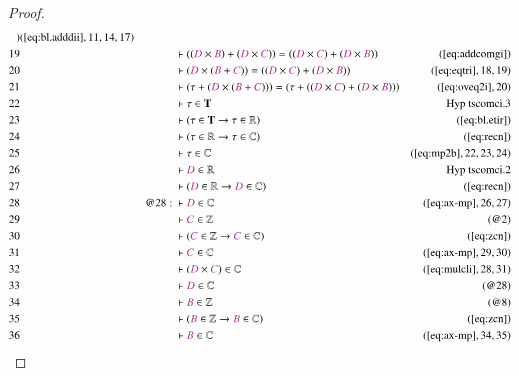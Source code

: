 \begin{proof}
\begin{align}
      )&(\mbox{\ref{eq:bl.adddii}},11,14,17)\notag
  \\ 19 &&  & \vdash ( ( \mc{D} \times \mc{B} ) + ( \mc{D} \times \mc{C} ) ) = (
      ( \mc{D} \times \mc{C} ) + ( \mc{D} \times \mc{B} )
      )&(\mbox{\ref{eq:addcomgi}})\notag
  \\ 20 &&  & \vdash ( \mc{D} \times ( \mc{B} + \mc{C} ) ) = ( ( \mc{D} \times
      \mc{C} ) + ( \mc{D} \times \mc{B} )
      )&(\mbox{\ref{eq:eqtri}},18,19)\notag
  \\ 21 &&  & \vdash ( \tau + ( \mc{D} \times ( \mc{B} + \mc{C} ) ) ) = ( \tau +
      ( ( \mc{D} \times \mc{C} ) + ( \mc{D} \times \mc{B} ) )
      )&(\mbox{\ref{eq:oveq2i}},20)\notag
  \\ 22 &&  & \vdash \tau \in
      \mathbf{T}&\text{Hyp~tscomci.3}\notag%
  \\ 23 &&  & \vdash ( \tau \in \mathbf{T} \rightarrow \tau \in \mathbb{R}
      )&(\mbox{\ref{eq:bl.etir}})\notag
  \\ 24 &&  & \vdash ( \tau \in \mathbb{R} \rightarrow \tau \in \mathbb{C}
      )&(\mbox{\ref{eq:recn}})\notag
  \\ 25 &&  & \vdash \tau \in \mathbb{C}&(\mbox{\ref{eq:mp2b}},22,23,24)\notag
  \\ 26 &&  & \vdash \mc{D} \in
      \mathbb{R}&\text{Hyp~tscomci.2}\notag%
  \\ 27 &&  & \vdash ( \mc{D} \in \mathbb{R} \rightarrow \mc{D} \in \mathbb{C}
      )&(\mbox{\ref{eq:recn}})\notag
  \\ 28 && @28:\  & \vdash \mc{D} \in
      \mathbb{C}&(\mbox{\ref{eq:ax-mp}},26,27)\notag
  \\ 29 &&  & \vdash \mc{C} \in \mathbb{Z}&(@2)\notag
  \\ 30 &&  & \vdash ( \mc{C} \in \mathbb{Z} \rightarrow \mc{C} \in \mathbb{C}
      )&(\mbox{\ref{eq:zcn}})\notag
  \\ 31 &&  & \vdash \mc{C} \in \mathbb{C}&(\mbox{\ref{eq:ax-mp}},29,30)\notag
  \\ 32 &&  & \vdash ( \mc{D} \times \mc{C} ) \in
      \mathbb{C}&(\mbox{\ref{eq:mulcli}},28,31)\notag
  \\ 33 &&  & \vdash \mc{D} \in \mathbb{C}&(@28)\notag
  \\ 34 &&  & \vdash \mc{B} \in \mathbb{Z}&(@8)\notag
  \\ 35 &&  & \vdash ( \mc{B} \in \mathbb{Z} \rightarrow \mc{B} \in \mathbb{C}
      )&(\mbox{\ref{eq:zcn}})\notag
  \\ 36 &&  & \vdash \mc{B} \in \mathbb{C}&(\mbox{\ref{eq:ax-mp}},34,35)\notag

\end{align}
\end{proof}
